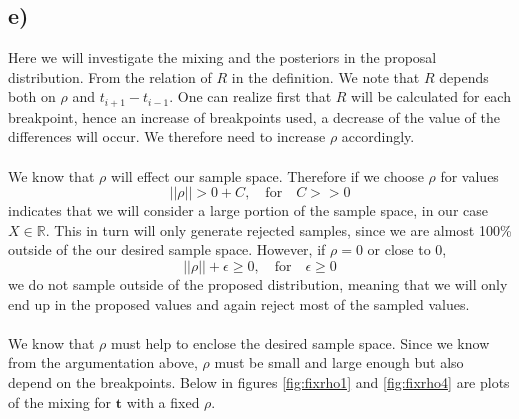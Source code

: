 \subsection*{e)}
Here we will investigate the mixing and the posteriors in the proposal distribution. From the relation of $R$ in the definition. We note that $R$ depends both on $\rho$ and $t_{i+1}-t_{i-1}$. One can realize first that $R$ will be calculated for each breakpoint, hence an increase of breakpoints used, a decrease of the value of the differences will occur. We therefore need to increase $\rho$ accordingly. \\
\\
We know that $\rho$ will effect our sample space. Therefore if we choose $\rho$ for values 
\[ || \rho || > 0 + C, \quad \text{for} \quad C>> 0 \] 
indicates that we will consider a large portion of the sample space, in our case $X\in\mathbb{R}$. This in turn will only generate rejected samples, since we are almost 100\% outside of the our desired sample space. However, if $\rho=0$ or close to $0$, 
\[ || \rho ||+ \epsilon \geq 0,  \quad \text{for} \quad \epsilon \geq 0 \] 
we do not sample outside of the proposed distribution, meaning that we will only end up in the proposed values and again reject most of the sampled values. \\
\\
We know that $\rho$ must help to enclose the desired sample space. Since we know from the argumentation above, $\rho$ must be small and large enough but also depend on the breakpoints. Below in figures \ref{fig:fixrho1} and \ref{fig:fixrho4} are plots of the mixing for $\boldsymbol{t}$ with a fixed $\rho$. \\
\\
